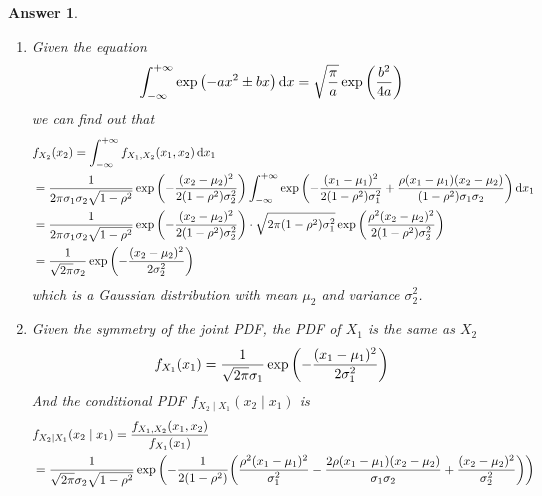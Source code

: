 \documentclass[utf8]{article}
\theoremstyle{definition}%
\theoremstyle{plain}%
\newtheorem{answer}{Answer} %
\begin{document}
\begin{answer} ~ 
    \begin{enumerate}[label=(\alph*)]
        \item Given the equation
        \begin{equation}
            \int_{-\infty}^{+\infty} \exp\qty(-a x^2 \pm b x) \dd{x} = \sqrt{\frac{\pi}{a}} \exp\qty(\frac{b^2}{4a})
        \end{equation}
        we can find out that
        \begin{equation}
        \begin{aligned}
            &f_{X_2}(x_2) = \int_{-\infty}^{+\infty} f_{X_1, X_2}(x_1, x_2) \dd{x_1} \\
            &= \frac{1}{2\pi \sigma_1\sigma_2 \sqrt{1 - \rho^2}} \exp\qty(-\frac{(x_2 - \mu_2)^2}{2(1 - \rho^2)\sigma_2^2}) \int_{-\infty}^{+\infty} \exp\qty(-\frac{(x_1 - \mu_1)^2}{2(1 - \rho^2)\sigma_1^2} + \frac{\rho (x_1 - \mu_1)(x_2 - \mu_2)}{(1 - \rho^2)\sigma_1\sigma_2}) \dd{x_1} \\ 
            &= \frac{1}{2\pi \sigma_1\sigma_2 \sqrt{1 - \rho^2}} \exp\qty(-\frac{(x_2 - \mu_2)^2}{2(1 - \rho^2)\sigma_2^2}) \cdot \sqrt{2\pi (1 - \rho^2) \sigma_1^2} \exp\qty(\frac{\rho^2 (x_2 - \mu_2)^2}{2(1 - \rho^2)\sigma_2^2}) \\ 
            &= \frac{1}{\sqrt{2\pi} \sigma_2} \exp\qty(-\frac{(x_2 - \mu_2)^2}{2\sigma_2^2}) 
        \end{aligned}
        \end{equation}
        which is a Gaussian distribution with mean $\mu_2$ and variance $\sigma_2^2$.
        \item Given the symmetry of the joint PDF, the PDF of $X_1$ is the same as $X_2$
        \begin{equation}
            f_{X_1}(x_1) = \frac{1}{\sqrt{2\pi} \sigma_1} \exp\qty(-\frac{(x_1 - \mu_1)^2}{2\sigma_1^2})
        \end{equation}
        And the conditional PDF $f_{X_2 \mid X_1}(x_2 \mid x_1)$ is
        \begin{equation}
        \begin{aligned}
            &f_{X_2 \mid X_1}(x_2 \mid x_1) = \frac{f_{X_1, X_2}(x_1, x_2)}{f_{X_1}(x_1)} \\ 
            &= \frac{1}{\sqrt{2\pi} \sigma_2\sqrt{1 - \rho^2}} \exp\qty(-\frac{1}{2(1 - \rho^2)} \qty(\frac{\rho^2 (x_1 - \mu_1)^2}{\sigma_1^2} - \frac{2\rho(x_1-\mu_1)(x_2-\mu_2)}{\sigma_1\sigma_2} + \frac{(x_2-\mu_2)^2}{\sigma_2^2})) \\

\end{aligned}
\end{equation}
\end{enumerate}
\end{answer}
\end{document}
